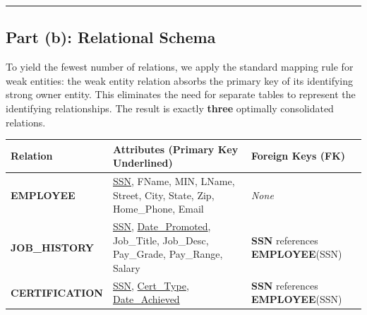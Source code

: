 \documentclass[12pt,a3paper]{article}
\begin{document}
\begin{enumerate}
\begin{tcolorbox}[enhanced,breakable,ansbox,colback=cA!4,colframe=cA,boxrule=0.8pt,arc=5pt,title={\textbf{Answer}},fonttitle=\bfseries\color{white},colbacktitle=cA]
\begin{center}
{
}
\end{center}

\vspace{1em}
\rule{\linewidth}{0.4pt}
\vspace{1em}

\subsection*{Part (b): Relational Schema}

To yield the fewest number of relations, we apply the standard mapping rule for weak entities: the weak entity relation absorbs the primary key of its identifying strong owner entity. This eliminates the need for separate tables to represent the identifying relationships. The result is exactly \textbf{three} optimally consolidated relations.

\vspace{1em}
\begin{center}
\renewcommand{\arraystretch}{1.5}
\begin{tabular}{@{} p{3.2cm} p{8.5cm} p{3.5cm} @{}}
\toprule
\textbf{Relation} & \textbf{Attributes \small (Primary Key Underlined)} & \textbf{Foreign Keys (FK)} \\
\midrule
\textbf{EMPLOYEE} & 
\underline{SSN}, FName, MIN, LName, Street, City, State, Zip, Home\_Phone, Email & 
\textit{None} \\

\textbf{JOB\_HISTORY} & 
\underline{SSN}, \underline{Date\_Promoted}, Job\_Title, Job\_Desc, Pay\_Grade, Pay\_Range, Salary & 
\textbf{SSN} references \textbf{EMPLOYEE}(SSN) \\

\textbf{CERTIFICATION} & 
\underline{SSN}, \underline{Cert\_Type}, \underline{Date\_Achieved} & 
\textbf{SSN} references \textbf{EMPLOYEE}(SSN) \\
\bottomrule
\end{tabular}
\end{center}


\end{tcolorbox}
\end{enumerate}
\end{document}

